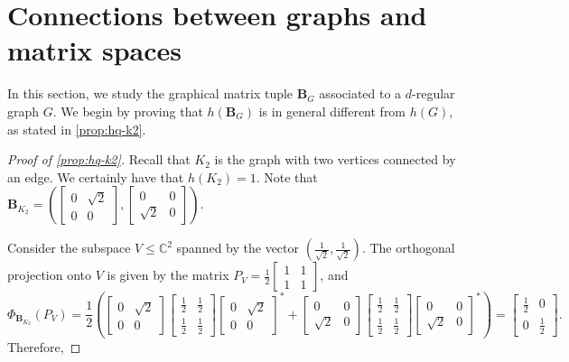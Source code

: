 \documentclass[11pt]{article}
\theoremstyle{plain}
\numberwithin{equation}{section}
\theoremstyle{definition}
\newcommand{\bC}{\mathbb{C}}
\newcommand{\tuple}[1]{\mathbf{#1}}
\newcommand{\vB}{\tuple{B}}
\newcommand\smat[1]{\left[\begin{smallmatrix}#1\end{smallmatrix}\right]}
\begin{document}
\section{Connections between graphs and matrix spaces}\label{sec:connections}
In this section, we study the graphical matrix tuple $\vB_G$ associated to a $d$-regular graph $G$.
We begin by proving that $h(\vB_G)$ is in general different from $h(G)$, as stated in \cref{prop:hq-k2}.
\begin{proof}[Proof of \cref{prop:hq-k2}]
	Recall that $K_2$ is the graph with two vertices connected by an edge. 
    We certainly have that $h(K_2)=1$. Note that $\vB_{K_2} = \left(\smat{0&\sqrt 2\\0&0}, \smat{0&0\\\sqrt 2&0}\right)$.

    Consider the subspace $V \leq \bC^2$ spanned by the vector $(\frac{1}{\sqrt 2},\frac{1}{\sqrt 2})$. The orthogonal projection onto $V$ is given by the matrix $P_V = \frac 12\smat{1&1\\ 1 & 1}$, and
    \[
        \Phi_{\vB_{K_2}} (P_V) = \frac 12 \left(
        \begin{bmatrix}
            0&\sqrt 2\\0&0
        \end{bmatrix}
        \begin{bmatrix}
            \frac 12 & \frac 12 \\ \frac 12&\frac 12
        \end{bmatrix}
        \begin{bmatrix}
            0&\sqrt 2\\0&0
        \end{bmatrix}^*
        +
        \begin{bmatrix}
            0&0\\\sqrt 2&0
        \end{bmatrix}
        \begin{bmatrix}
            \frac 12 & \frac 12 \\ \frac 12&\frac 12
        \end{bmatrix}
        \begin{bmatrix}
            0&0\\\sqrt 2&0
        \end{bmatrix}^*
        \right)
        =
        \begin{bmatrix}
            \frac 12 &0\\0&\frac 12
        \end{bmatrix}.
    \]
    Therefore,

\end{proof}
\end{document}
